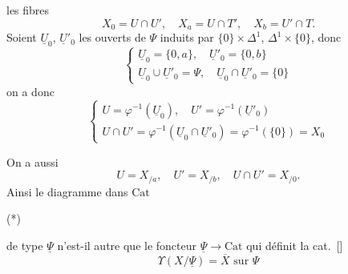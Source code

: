 \documentclass[11pt,a4paper]{article}
\begin{document}

les fibres 
\[
  X_0 = U \cap U', \quad X_a = U \cap T', \quad X_b = U' \cap T .
\]
Soient $\underline{U}_0$, $\underline{U}'_0$ les ouverts de $\Psi$ induits par $\{0\} \times \Delta^1$, $\Delta^1 \times \{0\}$, donc
\[
  \left\{
  \begin{array}{l}
  \underline{U}_0 = \{0, a\}, \quad \underline{U}'_0 = \{0, b\} \\
  \underline{U}_0 \cup \underline{U}'_0 = \Psi, \quad \underline{U}_0 \cap \underline{U}'_0 = \{0\}
  \end{array}
  \right.
\]
on a donc
\[
  \left\{
  \begin{array}{l}
  U = \varphi^{-1}(\underline{U}_0), \quad U' = \varphi^{-1}(\underline{U}'_0) \\
  U \cap U' = \varphi^{-1}(\underline{U}_0 \cap \underline{U}'_0) = \varphi^{-1}(\{0\}) = X_0
  \end{array}
  \right.
\]

On a aussi
\[
  U = X_{/a}, \quad U' = X_{/b}, \quad U \cap U' = X_{/0} .
\]
Ainsi le diagramme dans $\mathrm{Cat}$

(*)


de type $\underline{\Psi}$ n'est-il autre que le foncteur $\underline{\Psi} \to \mathrm{Cat}$ qui définit la cat.\ []
\[
  \Upsilon(X/\underline{\Psi}) = \overline{X} \text{ sur } \Psi
\]

\end{document}
